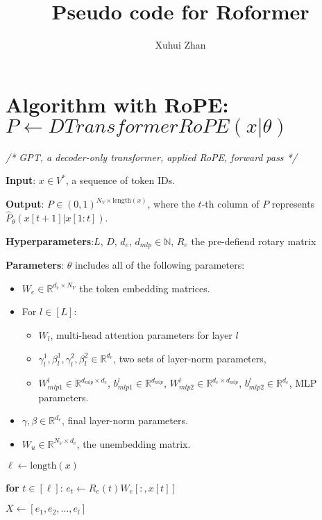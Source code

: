 \documentclass{article}
\begin{document}
\title{Pseudo code for Roformer}
\author{Xuhui Zhan}
\maketitle

\section*{Algorithm with RoPE: $P \leftarrow DTransformerRoPE(x|\theta)$}

\textit{/* GPT, a decoder-only transformer, applied RoPE, forward pass */}

\textbf{Input}: $x \in V^{*}$, a sequence of token IDs.

\textbf{Output}: $P \in (0, 1)^{N_V \times \text{length}(x)}$, where the $t$-th column of $P$ represents $\hat{P}_{\theta}(x[t+1]|x[1:t])$.

\textbf{Hyperparameters}:$L$, $D$, $d_e$, $d_{mlp} \in \mathbb{N}$, $R_e$ the pre-defiend rotary matrix

\textbf{Parameters}: $\theta$ includes all of the following parameters:
\begin{itemize}
  \item $W_e \in \mathbb{R}^{d_e \times N_V}$ the token embedding matrices.
  \item For $l \in [L]$:
  \begin{itemize}
    \item $W_{l}$, multi-head attention parameters for layer $l$ 
    \item $ \gamma_{l}^{1}, \beta_{l}^{1}, \gamma_{l}^{2}, \beta_{l}^{2} \in \mathbb{R}^{d_e}$, two sets of layer-norm parameters,
    \item $W_{mlp1}^{l} \in \mathbb{R}^{d_{mlp} \times d_e}$, $b_{mlp1}^{l} \in \mathbb{R}^{d_{mlp}}$, $W_{mlp2}^{l} \in \mathbb{R}^{d_e \times d_{mlp}}$, $b_{mlp2}^{l} \in \mathbb{R}^{d_e}$, MLP parameters.
  \end{itemize}
  \item $\gamma, \beta \in \mathbb{R}^{d_e}$, final layer-norm parameters.
  \item $W_u \in \mathbb{R}^{N_V \times d_e}$, the unembedding matrix.
\end{itemize}

$\ell \leftarrow \text{length}(x)$

\textbf{for} $t \in [\ell]$: $e_t \leftarrow R_e(t)W_e[:,x[t]]$

$X \leftarrow [e_1, e_2, \dots, e_l]$
\end{document}
